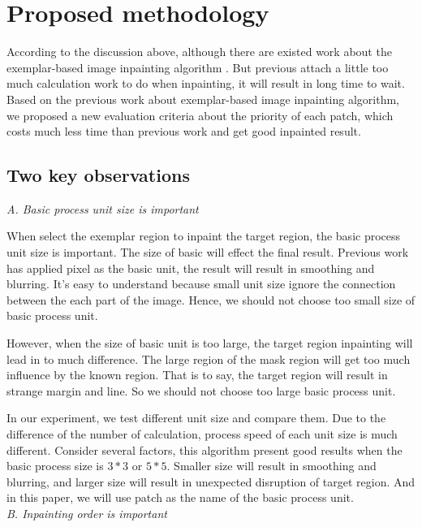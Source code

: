\section{Proposed methodology}
According to the discussion above, although there are existed work about the exemplar-based image inpainting algorithm \cite{cvpr03,tip04}. But previous attach a little too much calculation work to do when inpainting, it will result in long time to wait. Based on the previous work about exemplar-based image inpainting algorithm, we proposed a new evaluation criteria about the priority of each patch, which costs much less time than previous work and get good inpainted result.
\subsection{Two key observations}
\noindent \emph{A. Basic process unit size is important}

When select the exemplar region to inpaint the target region, the basic process unit size is important. The size of basic will effect the final result. Previous work has applied pixel as the basic unit\cite{iccv99}, the result will result in smoothing and blurring. It's easy to understand because small unit size ignore the connection between the each part of the image. Hence, we should not choose too small size of basic process unit. 

However, when the size of basic unit is too large, the target region inpainting will lead in to much difference. The large region of the mask region will get too much influence by the known region. That is to say, the target region will result in strange margin and line. So we should not choose too large basic process unit.

In our experiment, we test different unit size and compare them. Due to the difference of the number of calculation, process speed of each unit size is much different. Consider several factors, this algorithm present good results when the basic process size is $3*3$ or $5*5$.  Smaller size will result in smoothing and blurring, and larger size will result in unexpected disruption of target region. And in this paper, we will use patch as the name of the basic process unit.\\

\noindent \emph{B. Inpainting order is important}

